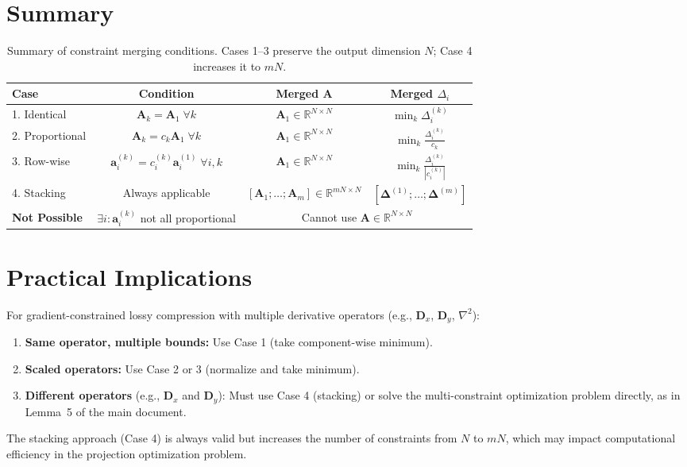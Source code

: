 \documentclass{article}
\begin{document}
\section{Summary}

\begin{table}[h]
\centering
\renewcommand{\arraystretch}{1.5}
\begin{tabular}{|l|c|c|c|}
\hline
\textbf{Case} & \textbf{Condition} & \textbf{Merged $\mathbf{A}$} & \textbf{Merged $\Delta_i$} \\
\hline
1. Identical & $\mathbf{A}_k = \mathbf{A}_1 \; \forall k$ & $\mathbf{A}_1 \in \mathbb{R}^{N \times N}$ & $\displaystyle\min_k \Delta_i^{(k)}$ \\
\hline
2. Proportional & $\mathbf{A}_k = c_k \mathbf{A}_1 \; \forall k$ & $\mathbf{A}_1 \in \mathbb{R}^{N \times N}$ & $\displaystyle\min_k \frac{\Delta_i^{(k)}}{c_k}$ \\
\hline
3. Row-wise & $\mathbf{a}_i^{(k)} = c_i^{(k)} \mathbf{a}_i^{(1)} \; \forall i,k$ & $\mathbf{A}_1 \in \mathbb{R}^{N \times N}$ & $\displaystyle\min_k \frac{\Delta_i^{(k)}}{|c_i^{(k)}|}$ \\
\hline
4. Stacking & Always applicable & $[\mathbf{A}_1; \ldots; \mathbf{A}_m] \in \mathbb{R}^{mN \times N}$ & $[\boldsymbol{\Delta}^{(1)}; \ldots; \boldsymbol{\Delta}^{(m)}]$ \\
\hline
\hline
\textbf{Not Possible} & $\exists i: \mathbf{a}_i^{(k)}$ not all proportional & \multicolumn{2}{c|}{Cannot use $\mathbf{A} \in \mathbb{R}^{N \times N}$} \\
\hline
\end{tabular}
\caption{Summary of constraint merging conditions. Cases 1--3 preserve the output dimension $N$; Case 4 increases it to $mN$.}
\end{table}

\section{Practical Implications}

For gradient-constrained lossy compression with multiple derivative operators (e.g., $\mathbf{D}_x$, $\mathbf{D}_y$, $\nabla^2$):

\begin{enumerate}
    \item \textbf{Same operator, multiple bounds:} Use Case 1 (take component-wise minimum).

    \item \textbf{Scaled operators:} Use Case 2 or 3 (normalize and take minimum).

    \item \textbf{Different operators} (e.g., $\mathbf{D}_x$ and $\mathbf{D}_y$): Must use Case 4 (stacking) or solve the multi-constraint optimization problem directly, as in Lemma~5 of the main document.
\end{enumerate}

The stacking approach (Case 4) is always valid but increases the number of constraints from $N$ to $mN$, which may impact computational efficiency in the projection optimization problem.
\end{document}
